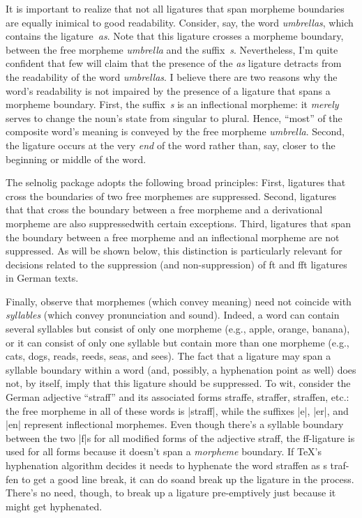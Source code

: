 \documentclass[11pt]{article}
\newcommand{\pkg}[1]{\textsf{#1}}
\begin{document}
It is important to realize that not all ligatures that span morpheme boundaries are equally inimical to good readability. Consider, say, the word \emph{umbrellas}, which contains the ligature~\emph{as}. Note that this ligature crosses a morpheme boundary, between the free morpheme \emph{umbrella} and the suffix~\emph{s}. Nevertheless, I'm quite confident that few will claim that the presence of the \emph{as} ligature detracts from the readability of the word \emph{umbrellas}. I believe there are two reasons why the word's readability is not impaired by the presence of a ligature that spans a morpheme boundary. First, the suffix~\emph{s} is an inflectional morpheme: it \emph{merely} serves to change the noun's state from singular to plural. Hence, \enquote{most} of the composite word's meaning is conveyed by the free morpheme \emph{umbrella}. Second, the ligature occurs at the very \emph{end} of the word rather than, say, closer to the beginning or middle of the word.

The \pkg{selnolig} package adopts the following broad principles: First, ligatures that cross the boundaries of two free morphemes are suppressed. Second, ligatures that that cross the boundary between a free morpheme and a derivational morpheme are also suppressed\textemdash with certain exceptions. Third, ligatures that span the boundary between a free morpheme and an inflectional morpheme are not suppressed. As will be shown below, this distinction is particularly relevant for decisions related to the suppression (and non-suppression) of ft and fft ligatures in German texts.

Finally, observe that morphemes (which convey meaning) need not coincide with \emph{syllables} (which convey pronunciation and sound). Indeed, a word can contain several syllables but consist of only one morpheme (e.g., apple, orange, banana), or it can consist of only one syllable but contain more than one morpheme (e.g., cats, dogs, reads, reeds, seas, and sees). The fact that a ligature may span a syllable boundary within a word (and, possibly, a hyphenation point as well) does not, by itself, imply that this ligature should be suppressed. To wit, consider the German adjective \enquote{straff} and its associated forms straffe, straffer, straffen, etc.: the free morpheme in all of these words is |straff|, while the suffixes |e|, |er|, and |en| represent inflectional morphemes. Even though there's a syllable boundary between the two |f|s for all modified forms of the adjective straff, the ff-ligature is used for all forms because it doesn't span a \emph{morpheme} boundary. If TeX's hyphenation algorithm decides it needs to hyphenate the word straffen as s\kern0pt traf-fen to get a good line break, it can do so\textemdash and break up the ligature in the process. There's no need, though, to break up a ligature pre-emptively just because it might get hyphenated.
\end{document}

